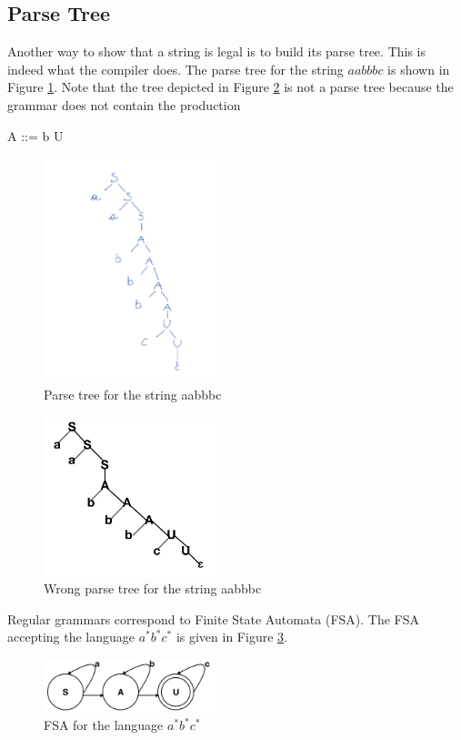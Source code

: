 \documentclass{article}
\begin{document}
\subsection*{Parse Tree}
Another way to show that a string is legal is to build its parse tree.
This is indeed what the compiler does. The parse tree for the string $aabbbc$ is shown in 
Figure \ref{parsetree}.  Note that the tree depicted in Figure \ref{parsetreewrong} is not
a parse tree because the grammar does not contain the production
\begin{center}
A ::= b U
\end{center}

\begin{figure}
  \centering
    \includegraphics[width=5cm]{parse_tree_1.png}
\caption{Parse tree for the string aabbbc}
  \label{parsetree}
\end{figure}




\begin{figure}
  \centering
    \includegraphics[width=5cm]{parse_tree_lecture2.png}
\caption{Wrong parse tree for the string aabbbc}
  \label{parsetreewrong}
\end{figure}


Regular grammars correspond to Finite State Automata (FSA). The FSA accepting the language $a^{*}b^{*}c^{*}$ 
is given in Figure \ref{fsa}.

\begin{figure}
  \centering
\begin{center}
    \includegraphics[width=5cm]{finite_state_automata.png}
\end{center}
\caption{FSA for the language $a^{*}b^{*}c^{*}$}
  \label{fsa}
\end{figure}
\end{document}
